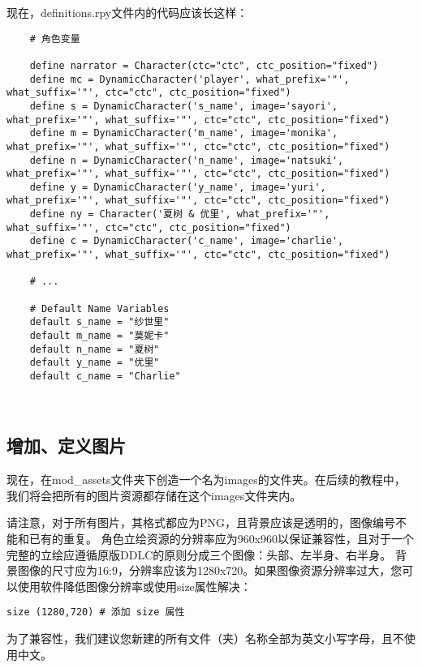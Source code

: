 \documentclass[../../Main.tex]{subfiles}
\begin{document}
现在，definitions.rpy文件内的代码应该长这样：
\begin{lstlisting}
    # 角色变量

    define narrator = Character(ctc="ctc", ctc_position="fixed")
    define mc = DynamicCharacter('player', what_prefix='"', what_suffix='"', ctc="ctc", ctc_position="fixed")
    define s = DynamicCharacter('s_name', image='sayori', what_prefix='"', what_suffix='"', ctc="ctc", ctc_position="fixed")
    define m = DynamicCharacter('m_name', image='monika', what_prefix='"', what_suffix='"', ctc="ctc", ctc_position="fixed")
    define n = DynamicCharacter('n_name', image='natsuki', what_prefix='"', what_suffix='"', ctc="ctc", ctc_position="fixed")
    define y = DynamicCharacter('y_name', image='yuri', what_prefix='"', what_suffix='"', ctc="ctc", ctc_position="fixed")
    define ny = Character('夏树 & 优里', what_prefix='"', what_suffix='"', ctc="ctc", ctc_position="fixed")
    define c = DynamicCharacter('c_name', image='charlie', what_prefix='"', what_suffix='"', ctc="ctc", ctc_position="fixed")
    
    # ...
    
    # Default Name Variables
    default s_name = "纱世里"
    default m_name = "莫妮卡"
    default n_name = "夏树"
    default y_name = "优里"
    default c_name = "Charlie"
    
    
\end{lstlisting}

\subsection{增加、定义图片}

现在，在mod\_assets文件夹下创造一个名为images的文件夹。在后续的教程中，我们将会把所有的图片资源都存储在这个images文件夹内。

\begin{Warning}
请注意，对于所有图片，其格式都应为PNG，且背景应该是透明的，图像编号不能和已有的重复。
角色立绘资源的分辨率应为960x960以保证兼容性，且对于一个完整的立绘应遵循原版DDLC的原则分成三个图像：头部、左半身、右半身。
背景图像的尺寸应为16:9，分辨率应该为1280x720。如果图像资源分辨率过大，您可以使用软件降低图像分辨率或使用size属性解决：
\begin{lstlisting}
size (1280,720) # 添加 size 属性
\end{lstlisting}

为了兼容性，我们建议您新建的所有文件（夹）名称全部为英文小写字母，且不使用中文。
\end{Warning}
\end{document}

